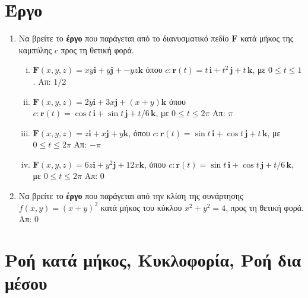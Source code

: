 \section*{Έργο}

\begin{enumerate}
  \item Να βρείτε το \textbf{έργο} που παράγεται από το διανυσματικό πεδίο 
    $ \mathbf{F} $ κατά μήκος της καμπύλης $c$ προς τη θετική φορά.
    \begin{enumerate}[i)]
      \item $ \mathbf{F}(x,y,z) = xy \mathbf{i} + y \mathbf{j} + -yz \mathbf{k}
        $ όπου $ c \colon \mathbf{r}(t)=t\, \mathbf{i} + t^{2}\, \mathbf{j} + t \,
        \mathbf{k}$, με $ 0 \leq t \leq 1 $. 
        \hfill Απ: $ 1/2 $ 
      \item $ \mathbf{F}(x,y,z) = 2y \mathbf{i} + 3x \mathbf{j} + (x+y) \mathbf{k}
        $ όπου $ c \colon \mathbf{r}(t)= \cos{t}\, \mathbf{i} + \sin{t}\, 
        \mathbf{j} + t/6 \, \mathbf{k} $, με $ 0 \leq t \leq 2 \pi $ 
        \hfill Απ: $ \pi $ 
      \item $ \mathbf{F}(x,y,z) = z \mathbf{i} + x \mathbf{j} + y \mathbf{k}
        $, όπου $ c \colon \mathbf{r}(t)= \sin{t}\, \mathbf{i} + \cos{t}\, 
        \mathbf{j} + t \, \mathbf{k}$, με $ 0 \leq t \leq 2 \pi $ 
        \hfill Απ: $ - \pi $  
      \item $ \mathbf{F}(x,y,z) = 6z \mathbf{i} + y^{2} \mathbf{j} + 12 x \mathbf{k}
        $, όπου $ c \colon \mathbf{r}(t)= \sin{t}\, \mathbf{i} + \cos{t}\, 
        \mathbf{j} + t/6 \, \mathbf{k}$, με $ 0 \leq t \leq 2 \pi $ 
        \hfill Απ: 0  
    \end{enumerate}

  \item Να βρείτε το \textbf{έργο} που παράγεται από την κλίση της συνάρτησης 
    $ f(x,y) = (x+y)^{2} $ κατά μήκος του κύκλου $ x^{2}+y^{2}=4 $, προς τη θετική φορά. 
    \hfill Απ: 0  
\end{enumerate}


\section*{Ροή κατά μήκος, Κυκλοφορία, Ροή δια μέσου}

